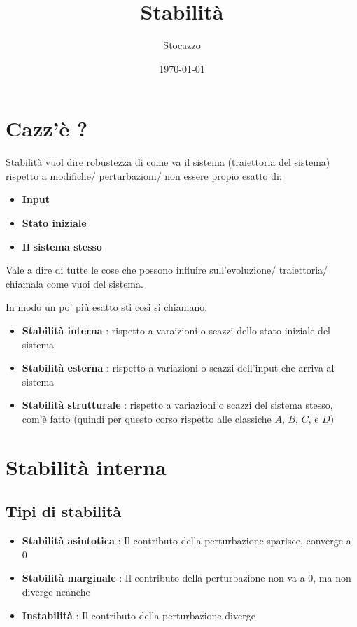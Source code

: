 \documentclass[11pt]{article}
\author{Stocazzo}
\date{\today}
\title{Stabilità}
\begin{document}
\maketitle
\tableofcontents


\section{Cazz'è ?}
\label{sec:org0136295}

Stabilità vuol dire robustezza di come va il sistema (traiettoria del
sistema) rispetto a modifiche/ perturbazioni/ non essere propio esatto
di:
\begin{itemize}
\item \textbf{Input}
\item \textbf{Stato iniziale}
\item \textbf{Il sistema stesso}
\end{itemize}

Vale a dire di tutte le cose che possono influire sull'evoluzione/
traiettoria/ chiamala come vuoi del sistema.

In modo un po' più esatto sti cosi si chiamano:
\begin{itemize}
\item \textbf{Stabilità interna} : rispetto a varaizioni o scazzi dello stato
iniziale del sistema
\item \textbf{Stabilità esterna} : rispetto a variazioni o scazzi dell'input
che arriva al sistema
\item \textbf{Stabilità strutturale} : rispetto a variazioni o scazzi del
sistema stesso, com'è fatto (quindi per questo corso
rispetto alle classiche \(A\), \(B\), \(C\), e \(D\))
\end{itemize}

\section{Stabilità interna}
\label{sec:orgd9a4210}
\subsection{Tipi di stabilità}
\label{sec:org03e41ad}
\begin{itemize}
\item \textbf{Stabilità asintotica} : Il contributo della perturbazione
sparisce, converge a 0
\item \textbf{Stabilità marginale} : Il contributo della perturbazione
non va a 0, ma non diverge neanche
\item \textbf{Instabilità} : Il contributo della perturbazione diverge
\end{itemize}
\end{document}
